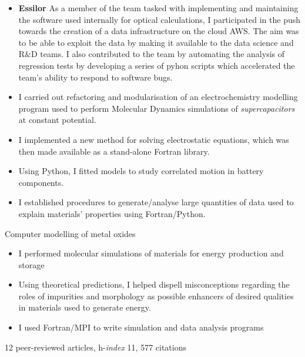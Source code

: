 \documentclass[10pt,a4paper,ragged2e,academicons]{altacv}
\begin{document}
\divider

\begin{itemize}
\item \textbf{Essilor} As a member of the team tasked with implementing and maintaining the software used internally for optical calculations, I participated in the push towards the creation of a data infrastructure on the cloud AWS. The aim was to be able to exploit the data by making it available to the data science and R\&D teams. I also contributed to the team by automating the analysis of regression tests by developing a series of pyhon scripts which accelerated the team's ability to respond to software bugs.
\end{itemize}

\divider

\begin{itemize}
\item I carried out refactoring and modularisation of an electrochemistry modelling program used to perform Molecular Dynamics simulations of \textit{supercapacitors} at constant potential.
\item I implemented a new method for solving electrostatic equations, which was then made available as a stand-alone Fortran library.  
\end{itemize}

\clearpage
{}

\begin{itemize}
\item Using Python, I fitted models to study correlated motion in
battery components.
\item I established procedures to generate/analyse large
quantities of data used to explain materials'
properties using Fortran/Python. 
\end{itemize}

\divider

Computer modelling of metal oxides
\smallskip
\begin{itemize}
\item I performed molecular simulations of materials for energy production and storage
\item Using theoretical predictions, I helped dispell
misconceptions regarding the roles of impurities
and morphology as possible enhancers of
desired qualities in materials used to generate
energy.
\item I used Fortran/MPI to write simulation and data analysis programs
\end{itemize}
{\small 12 peer-reviewed articles, h-\textit{index} 11, 577 citations}

\end{document}
